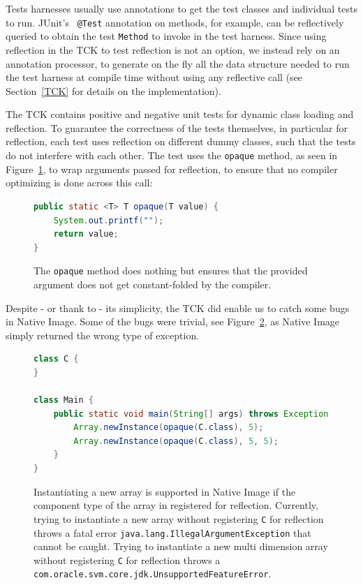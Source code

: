Tests harnesses usually use annotations to get the test classes and individual tests to run. JUnit's~\cite{noauthor_junit_nodate} \verb|@Test| annotation on methods, for example, can be reflectively queried to obtain the test \verb|Method| to invoke in the test harness.   
Since using reflection in the TCK to test reflection is not an option, we instead rely on an annotation processor, to generate on the fly all the data structure needed to run the test harness at compile time without using any reflective call (see Section~\ref{TCK} for details on the implementation). 

The TCK contains positive and negative unit tests for dynamic class loading and reflection. To guarantee the correctness of the tests themselves, in particular for reflection, each test uses reflection on different dummy classes, such that the tests do not interfere with each other.
The test uses the \verb|opaque| method, as seen in Figure~\ref{fig:opaque}, to wrap arguments passed for reflection, to ensure that no compiler optimizing is done across this call:
\begin{figure}[ht]
    \centering
\begin{lstlisting}[language=Java]
public static <T> T opaque(T value) {
    System.out.printf("");
    return value;
}
\end{lstlisting}
    \caption{The \texttt{opaque} method does nothing but ensures that the provided argument does not get constant-folded by the compiler.}
    \label{fig:opaque}
\end{figure}

Despite - or thank to - its simplicity, the TCK did enable us to catch some bugs in Native Image.
Some of the bugs were trivial, see Figure~\ref{fig:new_multi_array_bug}, as Native Image simply returned the wrong type of exception. 

\begin{figure}[ht]
    \centering
\begin{lstlisting}[language=Java]
class C {
}

class Main {
    public static void main(String[] args) throws Exception {
        Array.newInstance(opaque(C.class), 5);
        Array.newInstance(opaque(C.class), 5, 5);
    }
}
\end{lstlisting}
    \caption{Instantiating a new array is supported in Native Image if the component type of the array in registered for reflection. Currently, trying to instantiate a new array without registering \texttt{C} for reflection throws a fatal error \texttt{java.lang.IllegalArgumentException} that cannot be caught. Trying to instantiate a new multi dimension array without registering \texttt{C} for reflection throws a \texttt{com.oracle.svm.core.jdk.UnsupportedFeatureError}.}
    \label{fig:new_multi_array_bug}
\end{figure}

